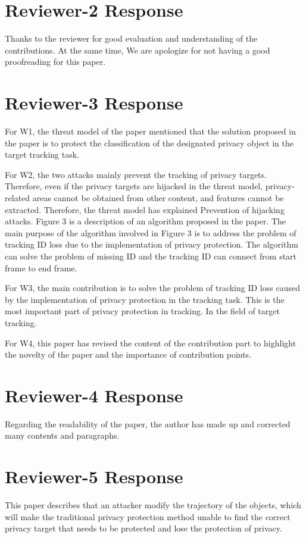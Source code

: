 \documentclass[letterpaper]{article} %
\begin{document}
\section{Reviewer-2 Response}
Thanks to the reviewer for good evaluation and understanding of the contributions. At the same time, We are apologize for not having a good proofreading for this paper.

\section{Reviewer-3 Response}
For W1, the threat model of the paper mentioned that the solution proposed in the paper is to protect the classification of the designated privacy object in the target tracking task.

For W2, the two attacks mainly prevent the tracking of privacy targets. Therefore, even if the privacy targets are hijacked in the threat model, privacy-related areas cannot be obtained from other content, and features cannot be extracted. Therefore, the threat model has explained Prevention of hijacking attacks. Figure 3 is a description of an algorithm proposed in the paper. The main purpose of the algorithm involved in Figure 3 is to address the problem of tracking ID loss due to the implementation of privacy protection. The algorithm can solve the problem of missing ID and the tracking ID can connect from start frame to end frame.

For W3, the main contribution is to solve the problem of tracking ID loss caused by the implementation of privacy protection in the tracking task. This is the most important part of privacy protection in tracking. In the field of target tracking.

For W4, this paper has revised the content of the contribution part to highlight the novelty of the paper and the importance of contribution points.

\section{Reviewer-4 Response}
Regarding the readability of the paper, the author has made up and corrected many contents and paragraphs. 

\section{Reviewer-5 Response}
This paper describes that an attacker modify the trajectory of the objects, which will make the traditional privacy protection method unable to find the correct privacy target that needs to be protected and lose the protection of privacy.
\end{document}
